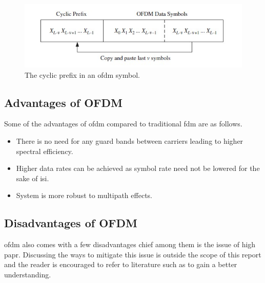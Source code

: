 \begin{figure}[!htbp]
\centering
\includegraphics[scale=1]{Chapter 2/Figures/Cyclic Prefix}
\caption[Cyclic Prefix]{The cyclic prefix in an \acrshort{ofdm} symbol.}
\label{fig:ofdm cyclic prefix}
\end{figure}



\subsection{Advantages of OFDM}
Some of the advantages of \acrshort{ofdm} compared to traditional \acrshort{fdm} are as follows.
\begin{itemize}
\item There is no need for any guard bands between carriers leading to higher spectral efficiency.
\item Higher data rates can be achieved as symbol rate need not be lowered for the sake of \acrshort{isi}.
\item System is more robust to multipath effects.
\end{itemize}

\subsection{Disadvantages of OFDM}
\acrshort{ofdm} also comes with a few disadvantages chief among them is the issue of high \acrshort{papr}. Discussing the ways to mitigate this issue is outside the scope of this report and the reader is encouraged to refer to literature such as \textcite{Ghosh2010} to gain a better understanding.

